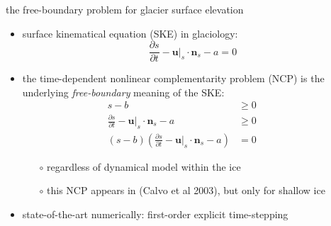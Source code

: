 \documentclass[10pt,dvipsnames]{beamer}
\newcommand{\bn}{\mathbf{n}}
\newcommand{\bu}{\mathbf{u}}
\begin{document}
\begin{frame}{the free-boundary problem for glacier surface elevation}

\begin{itemize}
\item surface kinematical equation (SKE) in glaciology:
   $$\frac{\partial s}{\partial t} - \bu|_s \cdot \bn_s - a = 0$$
\item the time-dependent nonlinear complementarity problem (NCP) is the underlying \emph{free-boundary} meaning of the SKE:
\begin{align*}
s - b &\ge 0 &&\phantom{x} \\
\frac{\partial s}{\partial t} - \bu|_s \cdot \bn_s - a &\ge 0 \\
(s - b) \left(\frac{\partial s}{\partial t} - \bu|_s \cdot \bn_s - a\right) &= 0
\end{align*}

    \begin{itemize}
    \item[$\circ$] regardless of dynamical model within the ice
    \item[$\circ$] this NCP appears in (Calvo et al 2003), but only for shallow ice
    \end{itemize}
\item state-of-the-art numerically: first-order explicit time-stepping
\end{itemize}
\end{frame}
\end{document}
